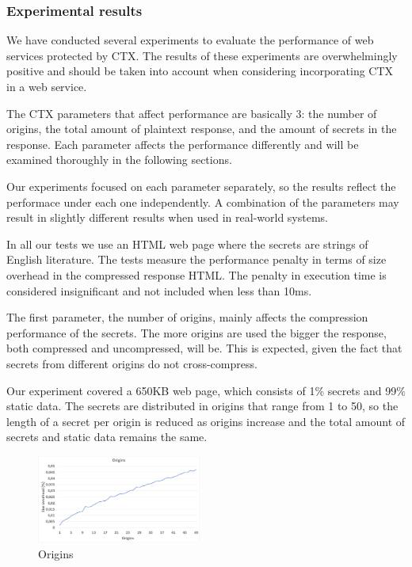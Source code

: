 \documentclass[conference, letterpaper, 10pt]{IEEEtran}
\begin{document}
\subsubsection{Experimental results}

We have conducted several experiments to evaluate the performance of web
services protected by CTX. The results of these experiments are overwhelmingly
positive and should be taken into account when considering incorporating CTX in
a web service.

The CTX parameters that affect performance are basically 3: the number of
origins, the total amount of plaintext response, and the amount of secrets in
the response. Each parameter affects the performance differently and will be
examined thoroughly in the following sections.

Our experiments focused on each parameter separately, so the results reflect the
performace under each one independently. A combination of the parameters may
result in slightly different results when used in real-world systems.

In all our tests we use an HTML web page where the secrets are strings of
English literature. The tests measure the performance penalty in terms of size
overhead in the compressed response HTML. The penalty in execution time is
considered insignificant and not included when less than 10ms.

The first parameter, the number of origins, mainly affects the compression
performance of the secrets. The more origins are used the bigger the response,
both compressed and uncompressed, will be. This is expected, given the fact that
secrets from different origins do not cross-compress.

Our experiment covered a 650KB web page, which consists of 1\% secrets and 99\%
static data. The secrets are distributed in origins that range from 1 to 50, so
the length of a secret per origin is reduced as origins increase and the total
amount of secrets and static data remains the same.

   \begin{figure}[thpb]
      \centering
      \includegraphics[width=0.48\textwidth]{experiments/origins.png}
      \caption{Origins}
   \end{figure}
\end{document}

